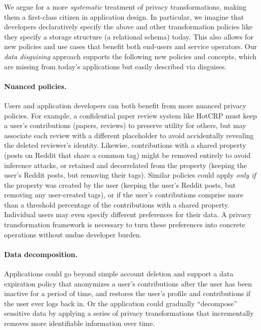 %
We argue for a more \emph{systematic} treatment of privacy transformations, making them a
first-class citizen in application design.
%
In particular, we imagine that developers declaratively specify the above and other
transformation policies like they specify a storage structure (\eg a relational schema) today.
%
This also allows for new policies and use cases that benefit both end-users and service operators.
%
Our \emph{data disguising} approach supports the following new policies and concepts,
which are missing from today's applications but easily described via disguises.
%

\paragraph{Nuanced policies.}
%
Users and application developers can both benefit from more nuanced privacy policies.
%
For example, a confidential paper review system like HotCRP must keep a user's contributions
(papers, reviews) to preserve utility for others, but may associate each review with a different
placeholder to avoid accidentally revealing the deleted reviewer's identity.
%
Likewise, contributions with a shared property (\eg posts on Reddit that share a common tag)
might be removed entirely to avoid inference attacks, or retained and decorrelated from the
property (\eg keeping the user's Reddit posts, but removing their tags).
%
Similar policies could apply \emph{only if} the property was created by the user (\eg keeping
the user's Reddit posts, but removing any user-created tags), or if the user's contributions
comprise more than a threshold percentage of the contributions with a shared property.
%
Individual users may even specify different preferences for their data.
%
A privacy transformation framework is necessary to turn these preferences into concrete
operations without undue developer burden.
%

\paragraph{Data decomposition.}
%
Applications could go beyond simple account deletion and support a data expiration policy that
anonymizes a user's contributions after the user has been inactive for a period of time, and
restores the user's profile and contributions if the user ever logs back in.
%
Or the application could gradually ``decompose'' sensitive data by applying a series of
privacy transformations that incrementally removes more identifiable information over time.
%

